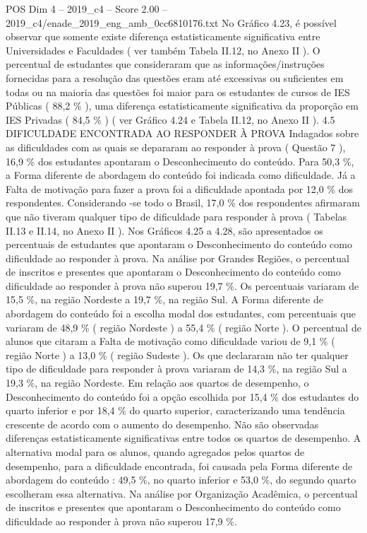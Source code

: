 \begin{textsample}{POS Dim 4 – 2019\_c4 – Score 2.00 – 2019\_c4/enade\_2019\_eng\_amb\_0cc6810176.txt}
No Gráfico 4.23, é possível observar que somente existe diferença estatisticamente significativa entre Universidades e Faculdades ( ver também Tabela II.12, no Anexo II ).
O percentual de estudantes que consideraram que as informações/instruções fornecidas para a resolução das questões eram até excessivas ou suficientes em todas ou na maioria das questões foi maior para os estudantes de cursos de IES Públicas ( 88,2 \% ), uma diferença estatisticamente significativa da proporção em IES Privadas ( 84,5 \% ) ( ver Gráfico 4.24 e Tabela II.12, no Anexo II ). 4.5 DIFICULDADE ENCONTRADA AO RESPONDER À PROVA Indagados sobre as dificuldades com as quais se depararam ao responder à prova ( Questão 7 ), 16,9 \% dos estudantes apontaram o Desconhecimento do conteúdo.
Para 50,3 \%, a Forma diferente de abordagem do conteúdo foi indicada como dificuldade.
Já a Falta de motivação para fazer a prova foi a dificuldade apontada por 12,0 \% dos respondentes.
Considerando -se todo o Brasil, 17,0 \% dos respondentes afirmaram que não tiveram qualquer tipo de dificuldade para responder à prova ( Tabelas II.13 e II.14, no Anexo II ).
Nos Gráficos 4.25 a 4.28, são apresentados os percentuais de estudantes que apontaram o Desconhecimento do conteúdo como dificuldade ao responder à prova.
Na análise por Grandes Regiões, o percentual de inscritos e presentes que apontaram o Desconhecimento do conteúdo como dificuldade ao responder à prova não superou 19,7 \%.
Os percentuais variaram de 15,5 \%, na região Nordeste a 19,7 \%, na região Sul.
A Forma diferente de abordagem do conteúdo foi a escolha modal dos estudantes, com percentuais que variaram de 48,9 \% ( região Nordeste ) a 55,4 \% ( região Norte ).
O percentual de alunos que citaram a Falta de motivação como dificuldade variou de 9,1 \% ( região Norte ) a 13,0 \% ( região Sudeste ).
Os que declararam não ter qualquer tipo de dificuldade para responder à prova variaram de 14,3 \%, na região Sul a 19,3 \%, na região Nordeste.
Em relação aos quartos de desempenho, o Desconhecimento do conteúdo foi a opção escolhida por 15,4 \% dos estudantes do quarto inferior e por 18,4 \% do quarto superior, caracterizando uma tendência crescente de acordo com o aumento do desempenho.
Não são observadas diferenças estatisticamente significativas entre todos os quartos de desempenho.
A alternativa modal para os alunos, quando agregados pelos quartos de desempenho, para a dificuldade encontrada, foi causada pela Forma diferente de abordagem do conteúdo : 49,5 \%, no quarto inferior e 53,0 \%, do segundo quarto escolheram essa alternativa.
Na análise por Organização Acadêmica, o percentual de inscritos e presentes que apontaram o Desconhecimento do conteúdo como dificuldade ao responder à prova não superou 17,9 \%.

\end{textsample}
